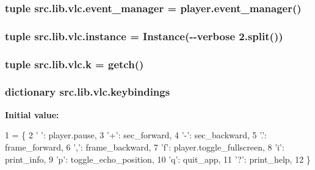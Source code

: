 \subsubsection[{event\+\_\+manager}]{\setlength{\rightskip}{0pt plus 5cm}tuple src.\+lib.\+vlc.\+event\+\_\+manager = player.\+event\+\_\+manager()}\label{namespacesrc_1_1lib_1_1vlc_ae922780d616514f232b958b05f06cbb6}
\hypertarget{namespacesrc_1_1lib_1_1vlc_a34527395ebcccc291766742d4ad044c8}{}
\subsubsection[{instance}]{\setlength{\rightskip}{0pt plus 5cm}tuple src.\+lib.\+vlc.\+instance = {\bf Instance}(\textquotesingle{}-\/-\/verbose 2\textquotesingle{}.split())}\label{namespacesrc_1_1lib_1_1vlc_a34527395ebcccc291766742d4ad044c8}
\hypertarget{namespacesrc_1_1lib_1_1vlc_ad17333db2b2d9eb13c8d91c967e8d3e9}{}
\subsubsection[{k}]{\setlength{\rightskip}{0pt plus 5cm}tuple src.\+lib.\+vlc.\+k = {\bf getch}()}\label{namespacesrc_1_1lib_1_1vlc_ad17333db2b2d9eb13c8d91c967e8d3e9}
\hypertarget{namespacesrc_1_1lib_1_1vlc_abfca255518db45fa1b864ac867863843}{}
\subsubsection[{keybindings}]{\setlength{\rightskip}{0pt plus 5cm}dictionary src.\+lib.\+vlc.\+keybindings}\label{namespacesrc_1_1lib_1_1vlc_abfca255518db45fa1b864ac867863843}
{\bfseries Initial value\+:}
\begin{DoxyCode}
1 = \{
2             \textcolor{stringliteral}{' '}: player.pause,
3             \textcolor{stringliteral}{'+'}: sec\_forward,
4             \textcolor{stringliteral}{'-'}: sec\_backward,
5             \textcolor{stringliteral}{'.'}: frame\_forward,
6             \textcolor{stringliteral}{','}: frame\_backward,
7             \textcolor{stringliteral}{'f'}: player.toggle\_fullscreen,
8             \textcolor{stringliteral}{'i'}: print\_info,
9             \textcolor{stringliteral}{'p'}: toggle\_echo\_position,
10             \textcolor{stringliteral}{'q'}: quit\_app,
11             \textcolor{stringliteral}{'?'}: print\_help,
12             \}
\end{DoxyCode}
\hypertarget{namespacesrc_1_1lib_1_1vlc_a0e3abf116434381009146b4b6f13bd88}{}
